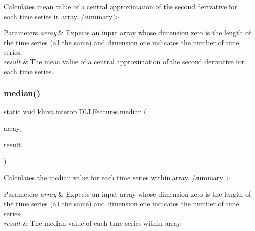Calculates mean value of a central approximation of the second derivative for each time series in array. /summary$>$ 
\begin{DoxyParams}{Parameters}
{\em array} & Expects an input array whose dimension zero is the length of the time series (all the same) and dimension one indicates the number of time series.\\
\hline
{\em result} & The mean value of a central approximation of the second derivative for each time series.\\
\hline
\end{DoxyParams}


\mbox{\label{classkhiva_1_1interop_1_1_d_l_l_features_a7d81c9be7dd0383ee0aa696a86232255}} 
\subsubsection{\texorpdfstring{median()}{median()}}
{\footnotesize\ttfamily static void khiva.\+interop.\+D\+L\+L\+Features.\+median (\begin{DoxyParamCaption}\item[{\mbox{[}\+In\mbox{]} ref Int\+Ptr}]{array,  }\item[{\mbox{[}\+Out\mbox{]} out Int\+Ptr}]{result }\end{DoxyParamCaption})\hspace{0.3cm}{\ttfamily [static]}}



Calculates the median value for each time series within array. /summary$>$ 
\begin{DoxyParams}{Parameters}
{\em array} & Expects an input array whose dimension zero is the length of the time series (all the same) and dimension one indicates the number of time series.\\
\hline
{\em result} & The median value of each time series within array.\\
\hline
\end{DoxyParams}


\mbox{\label{classkhiva_1_1interop_1_1_d_l_l_features_a3be3069b086e3790b877a535b267bd43}} 
